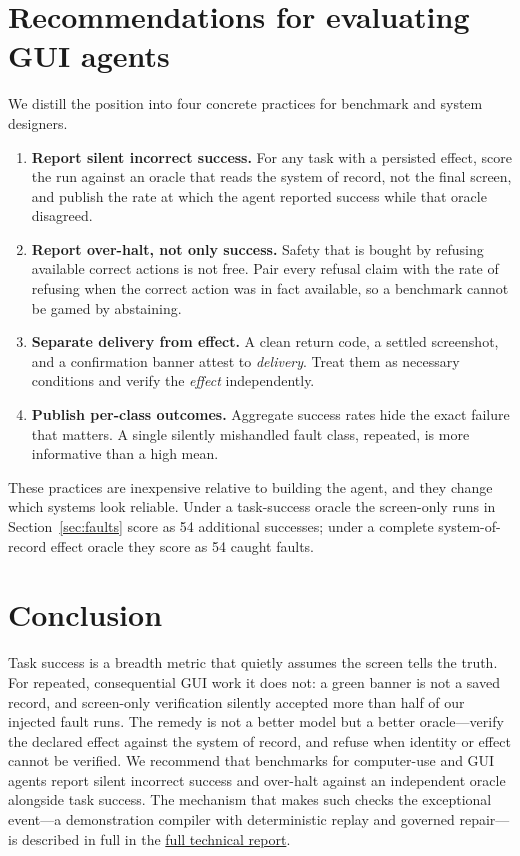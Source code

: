 \documentclass[10pt]{article}
\newcommand{\fullreport}{\href{https://github.com/OpenAdaptAI/openadapt-flow}{full technical report}}
\begin{document}
\section{Recommendations for evaluating GUI agents}
\label{sec:recs}

We distill the position into four concrete practices for benchmark and system
designers.
\begin{enumerate}
  \item \textbf{Report silent incorrect success.} For any task with a persisted
        effect, score the run against an oracle that reads the system of record,
        not the final screen, and publish the rate at which the agent reported
        success while that oracle disagreed.
  \item \textbf{Report over-halt, not only success.} Safety that is bought by
        refusing available correct actions is not free. Pair every refusal claim
        with the rate of refusing when the correct action was in fact available,
        so a benchmark cannot be gamed by abstaining.
  \item \textbf{Separate delivery from effect.} A clean return code, a settled
        screenshot, and a confirmation banner attest to \emph{delivery}. Treat
        them as necessary conditions and verify the \emph{effect} independently.
  \item \textbf{Publish per-class outcomes.} Aggregate success rates hide the
        exact failure that matters. A single silently mishandled fault class,
        repeated, is more informative than a high mean.
\end{enumerate}
These practices are inexpensive relative to building the agent, and they change
which systems look reliable. Under a task-success oracle the screen-only runs in
Section~\ref{sec:faults} score as 54 additional successes; under a complete
system-of-record effect oracle they score as 54 caught faults.

\section{Conclusion}
\label{sec:conclusion}

Task success is a breadth metric that quietly assumes the screen tells the truth.
For repeated, consequential GUI work it does not: a green banner is not a saved
record, and screen-only verification silently accepted more than half of our
injected fault runs. The remedy is not a better model but a better oracle---verify
the declared effect against the system of record, and refuse when identity or
effect cannot be verified. We recommend that benchmarks for computer-use and GUI
agents report silent incorrect success and over-halt against an independent
oracle alongside task success. The mechanism that makes such checks the
exceptional event---a demonstration compiler with deterministic replay and
governed repair---is described in full in the \fullreport{}.
\end{document}
